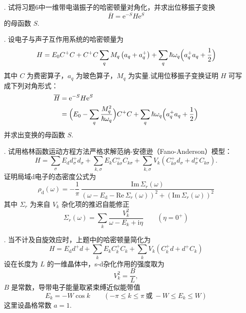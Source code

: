 {.} 试将习题6中一维带电谐振子的哈密顿量对角化，并求出位移振子变换
\begin{equation*}
  \overline{H}=\mathrm{e}^{-S}H\mathrm{e}^{S}
\end{equation*}
的母函数 $S$.

{.} 设电子与声子互作用系统的哈密顿量为
\begin{equation*}
  H=E_{0}C^{+}C+C^{+}C\sum_{q}M_{q}\left(a_{q}+a^{+}_{q}\right)
  +\sum_{q}\hbar\omega_{q}\Bigl(a^{+}_{q}a_{q}+\frac{1}{2}\Bigr)
\end{equation*}
其中 $C$ 为费密算子，$a_{q}$ 为玻色算子，$M_{q}$ 为实量.试用位移振子变换证明 $H$ 可写成下列对角形式：
\begin{equation*}
\begin{aligned}
  \overline{H}&=\mathrm{e}^{-S}H\mathrm{e}^{S}\\
  &=\Bigl(E_{0}-\sum_{q}\frac{M_{q}^{2}}{\hbar\omega_{q}}\Bigr)C^{+}C
  +\sum_{q}\hbar\omega_{q}\Bigl(a^{+}_{q}a_{q}+\frac{1}{2}\Bigr)
\end{aligned}
\end{equation*}
并求出变换的母函数 $S$.

{.} 试用格林函数运动方程方法严格求解范纳-安德逊（Fano-Anderson）模型：
\begin{equation*}
  H=\sum_{\sigma}E_{\mathrm{d}}d^{+}_{\sigma}d_{\sigma}
  +\sum_{k,\sigma}E_{k}C^{+}_{k\sigma}C_{k\sigma}
  +\sum_{k,\sigma}V_{k}\left(C^{+}_{k\sigma}d_{\sigma}+d^{+}_{\sigma}C_{k\sigma}\right).
\end{equation*}
证明局域d电子的态密度公式为
\begin{equation*}
  \rho_{\mathrm{d}}(\omega)=-\frac{1}{\pi}\,
  \frac{\mathrm{Im}\,\Sigma_{r}(\omega)}
  {\left(\omega-E_{\mathrm{d}}-\mathrm{Re}\,\Sigma_{r}(\omega)\right)^{2}
  +\left(\mathrm{Im}\,\Sigma_{r}(\omega)\right)^{2}}
\end{equation*}
其中 $\Sigma_{r}$ 为来自 $V_{k}$ 杂化项的推迟自能修正
\begin{equation*}
  \Sigma_{r}(\omega)=\sum_{k}\frac{V_{k}^{2}}{\omega-E_{k}+\mathrm{i}\eta}
  \qquad\left(\eta=0^{+}\right)
\end{equation*}

{.} 当不计及自旋效应时，上题中的哈密顿量简化为
\begin{equation*}
  H=E_{\mathrm{d}}d^{+}d+\sum_{k}E_{k}C^{+}_{k}C_{k}
  +\sum_{k}V_{k}\left(C^{+}_{k}d+d^{+}C_{k}\right)
\end{equation*}
设在长度为 $L$ 的一维晶体中，s-d杂化作用的强度取为
\begin{equation*}
  V_{k}^{2}=\frac{B}{L},
\end{equation*}
$B$ 是常数，导带电子能量取紧束缚近似能带值
\begin{equation*}
  E_{k}=-W\cos k\qquad
  \left(-\pi\leqslant k\leqslant\pi\ \text{或}\ -W\leqslant E_{k}\leqslant W\right)
\end{equation*}
这里设晶格常数 $a=1$.

